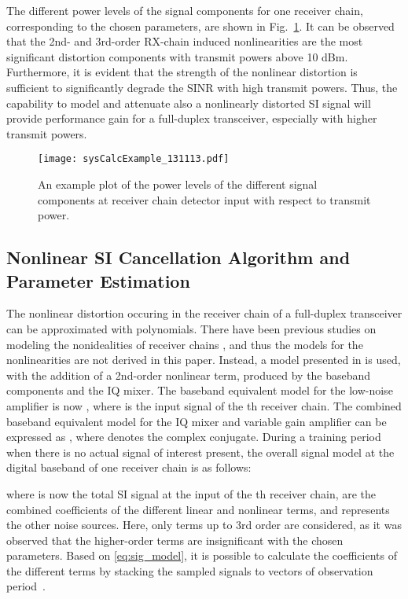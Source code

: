 \documentclass[conference,twoside,letterpaper,10pt]{IEEEtran}
\begin{document}
The different power levels of the signal components for one receiver chain, corresponding to the chosen parameters, are shown in Fig.~\ref{fig:p_all_example}. It can be observed that the 2nd- and 3rd-order RX-chain induced nonlinearities are the most significant distortion components with transmit powers above 10 dBm. Furthermore, it is evident that the strength of the nonlinear distortion is sufficient to significantly degrade the SINR with high transmit powers. Thus, the capability to model and attenuate also a nonlinearly distorted SI signal will provide performance gain for a full-duplex transceiver, especially with higher transmit powers.

\begin{figure}[!t]
\centering
\texttt{[image: sysCalcExample\_131113.pdf]}
\caption{An example plot of the power levels of the different signal components at receiver chain detector input with respect to transmit power.}
\label{fig:p_all_example}
\end{figure}

\subsection{Nonlinear SI Cancellation Algorithm and Parameter Estimation}

The nonlinear distortion occuring in the receiver chain of a full-duplex transceiver can be approximated with polynomials. There have been previous studies on modeling the nonidealities of receiver chains \cite{Grimm13}, and thus the models for the nonlinearities are not derived in this paper. Instead, a model presented in \cite{Grimm13} is used, with the addition of a 2nd-order nonlinear term, produced by the baseband components and the IQ mixer. The baseband equivalent model for the low-noise amplifier is now , where  is the input signal of the th receiver chain. The combined baseband equivalent model for the IQ mixer and variable gain amplifier can be expressed as , where  denotes the complex conjugate. During a training period when there is no actual signal of interest present, the overall signal model at the digital baseband of one receiver chain is as follows:

where  is now the total SI signal at the input of the th receiver chain,  are the combined coefficients of the different linear and nonlinear terms, and  represents the other noise sources. Here, only terms up to 3rd order are considered, as it was observed that the higher-order terms are insignificant with the chosen parameters. Based on \eqref{eq:sig_model}, it is possible to calculate the coefficients of the different terms by stacking the sampled signals to vectors of observation period~.
\end{document}
